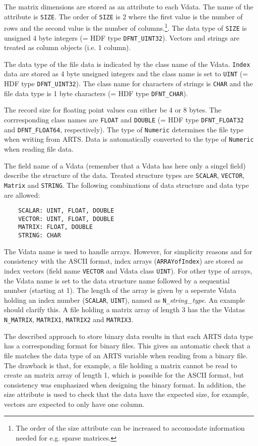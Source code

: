  The matrix dimensions are stored as an attribute to each Vdata. The
 name of the attribute is \verb|SIZE|. The order of \verb|SIZE| is 2
 where the first value is the number of rows and the second value is
 the number of columns.\footnote{The order of the size attribute can
   be increased to accomodate information needed for e.g. sparse
   matrices.}. The data type of \verb|SIZE| is unsigned 4 byte
 integers (= HDF type \verb|DFNT_UINT32|). Vectors and strings are
 treated as column objects (i.e. 1 column).
 
 The data type of the file data is indicated by the class name of the
 Vdata. \verb|Index| data are stored as 4 byte unsigned integers and
 the class name is set to \verb|UINT| (= HDF type \verb|DFNT_UINT32|).
 The class name for characters of strings is \verb|CHAR| and the file
 data type is 1 byte characters (= HDF type \verb|DFNT_CHAR|).

 The record size for floating point values can either be 4 or 8 bytes.
 The corrresponding class names are \verb|FLOAT| and \verb|DOUBLE|
 (= HDF type \verb|DFNT_FLOAT32| and \verb|DFNT_FLOAT64|, respectively).
 The type of \verb|Numeric| determines the file type when writing from
 ARTS. Data is automatically converted to the type of \verb|Numeric|
 when reading file data.
 
 The field name of a Vdata (remember that a Vdata has here only a
 singel field) describe the structure of the data. Treated structure
 types are \verb|SCALAR|, \verb|VECTOR|, \verb|Matrix| and \verb|STRING|.
 The following combinations of data structure and data type are allowed:
 \begin{verbatim}
    SCALAR: UINT, FLOAT, DOUBLE 
    VECTOR: UINT, FLOAT, DOUBLE 
    MATRIX: FLOAT, DOUBLE 
    STRING: CHAR
 \end{verbatim} 
 The Vdata name is used to handle arrays. However, for simplicity
 reasons and for consistency with the ASCII format, index arrays
 (\verb|ARRAYofIndex|) are stored as index vectors (field name
 \verb|VECTOR| and Vdata class \verb|UINT|). For other type of
 arrays, the Vdata name is set to the data structure name followed
 by a sequential number (starting at 1). The length of the array
 is given by a seperate Vdata holding an index number (\verb|SCALAR|,
 \verb|UINT|), named as \verb|N_|{\it string\_type}. An example should
 clarify this. A file holding a matrix array of length 3 has the
 the Vdatas \verb|N_MATRIX|, \verb|MATRIX1|, \verb|MATRIX2| and
 \verb|MATRIX3|.

 The described approach to store binary data results in that each
 ARTS data type has a corresponding format for binary files. This 
 gives an automatic check that a file matches the data type of
 an ARTS variable when reading from a binary file. The drawback
 is that, for example, a file holding a matrix cannot be read to create
 an matrix array of length 1, which is possible for the ASCII format,
 but consistency was emphasized when designing the binary format.
 In addition, the size attribute is used to check that the data
 have the expected size, for example, vectors are expected to only
 have one column.
 

